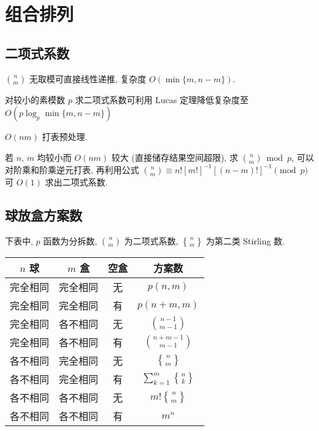 \clearpage
\section{组合排列}
\subsection{二项式系数}
$\displaystyle\binom nm$ 无取模可直接线性递推, 复杂度 $O(\min\{m,n-m\})$.



对较小的素模数 $p$ 求二项式系数可利用 Lucas 定理降低复杂度至 $O(p\log_p\min\{m,n-m\})$



$O(nm)$ 打表预处理.



若 $n$, $m$ 均较小而 $O(nm)$ 较大 (直接储存结果空间超限), 求 $\displaystyle\binom nm\bmod p$, 可以对阶乘和阶乘逆元打表, 再利用公式 $\displaystyle\binom nm\equiv n![m!]^{-1}[(n-m)!]^{-1}\pmod p$ 可 $O(1)$ 求出二项式系数.

\clearpage
\subsection{球放盒方案数}

下表中, $p$ 函数为分拆数, $\displaystyle\binom nm$ 为二项式系数, $\genfrac\{\}{0pt}0nm$ 为第二类 Stirling 数.

\begin{center}
  \begin{tabular}{cccc}
    \toprule
    $n$ 球   &  $m$ 盒  & 空盒 & 方案数 \\
    \toprule
    完全相同 & 完全相同 &  无  & $\displaystyle p(n,m)$\\
    \midrule
    完全相同 & 完全相同 &  有  & $\displaystyle p(n+m,m)$ \\
    \midrule
    完全相同 & 各不相同 &  无  & $\displaystyle\binom{n-1}{m-1}$ \\
    \midrule
    完全相同 & 各不相同 &  有  & $\displaystyle\binom{n+m-1}{m-1}$ \\
    \midrule
    各不相同 & 完全相同 &  无  & $\displaystyle\genfrac\{\}{0pt}0nm$ \\
    \midrule
    各不相同 & 完全相同 &  有  & $\displaystyle\sum_{k=1}^m\genfrac\{\}{0pt}0nk$ \\
    \midrule
    各不相同 & 各不相同 &  无  & $\displaystyle m!\genfrac\{\}{0pt}0nm$ \\
    \midrule
    各不相同 & 各不相同 &  有  & $\displaystyle m^n$ \\
    \bottomrule
  \end{tabular}
\end{center}
